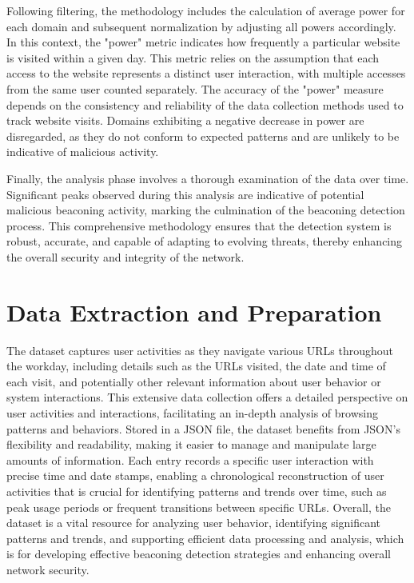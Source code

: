 Following filtering, the methodology includes the calculation of average power for each domain and subsequent normalization by adjusting all powers accordingly. In this context, the "power" metric indicates how frequently a particular website is visited within a given day. This metric relies on the assumption that each access to the website represents a distinct user interaction, with multiple accesses from the same user counted separately. The accuracy of the "power" measure depends on the consistency and reliability of the data collection methods used to track website visits. Domains exhibiting a negative decrease in power are disregarded, as they do not conform to expected patterns and are unlikely to be indicative of malicious activity.

Finally, the analysis phase involves a thorough examination of the data over time. Significant peaks observed during this analysis are indicative of potential malicious beaconing activity, marking the culmination of the beaconing detection process. This comprehensive methodology ensures that the detection system is robust, accurate, and capable of adapting to evolving threats, thereby enhancing the overall security and integrity of the network.
\section{Data Extraction and Preparation}
The dataset captures user activities as they navigate various URLs throughout the workday, including details such as the URLs visited, the date and time of each visit, and potentially other relevant information about user behavior or system interactions. This extensive data collection offers a detailed perspective on user activities and interactions, facilitating an in-depth analysis of browsing patterns and behaviors. Stored in a JSON file, the dataset benefits from JSON's flexibility and readability, making it easier to manage and manipulate large amounts of information. Each entry records a specific user interaction with precise time and date stamps, enabling a chronological reconstruction of user activities that is crucial for identifying patterns and trends over time, such as peak usage periods or frequent transitions between specific URLs. Overall, the dataset is a vital resource for analyzing user behavior, identifying significant patterns and trends, and supporting efficient data processing and analysis, which is  for developing effective beaconing detection strategies and enhancing overall network security.

